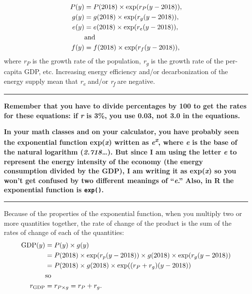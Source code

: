 \documentclass[
]{article}
\begin{document}
\[
\begin{aligned}
  P(y) &= P(2018) \times \exp(r_P (y - 2018)),\\
  g(y) &= g(2018) \times \exp(r_g (y - 2018)),\\
  e(y) &= e(2018) \times \exp(r_e (y - 2018)),\\
  \lefteqn{\text{and}}\\
  f(y) &= f(2018) \times \exp(r_f (y - 2018)),\\
\end{aligned}
\] where \emph{r\textsubscript{P}} is the growth rate of the population,
\emph{r\textsubscript{g}} is the growth rate of the per-capita GDP, etc.
Increasing energy efficiency and/or decarbonization of the energy supply
mean that \emph{r\textsubscript{e}} and/or \emph{r\textsubscript{f}} are
negative.

\begin{center}\rule{0.5\linewidth}{1pt}\end{center}

\textbf{Remember that you have to divide percentages by 100 to get the
rates for these equations: if \emph{r} is 3\%, you use 0.03, not 3.0 in
the equations.}

\textbf{In your math classes and on your calculator, you have probably
seen the exponential function exp(\emph{x}) written as
\emph{e\textsuperscript{x}}, where \emph{e} is the base of the natural
logarithm (\emph{2.718\ldots{}}). But since I am using the letter
\emph{e} to represent the energy intensity of the economy (the energy
consumption divided by the GDP), I am writing it as exp(\emph{x}) so you
won't get confused by two different meanings of ``\emph{e}.'' Also, in R
the exponential function is \texttt{exp()}.}

\begin{center}\rule{0.5\linewidth}{1pt}\end{center}

Because of the properties of the exponential function, when you multiply
two or more quantities together, the rate of change of the product is
the sum of the rates of change of each of the quantities: \[
\begin{aligned}
  \mathrm{GDP}(y) &= P(y)\times g(y)\\
    &= P(2018) \times \exp(r_p (y - 2018))
    \times g(2018) \times \exp(r_g (y - 2018))\\
    &= P(2018)\times g(2018)
    \times \exp((r_P + r_g) (y - 2018))\\
    \lefteqn{\text{so}}\\
  r_{\mathrm{GDP}} &= r_{P\times g} = r_P + r_g.
\end{aligned}
\]
\end{document}
